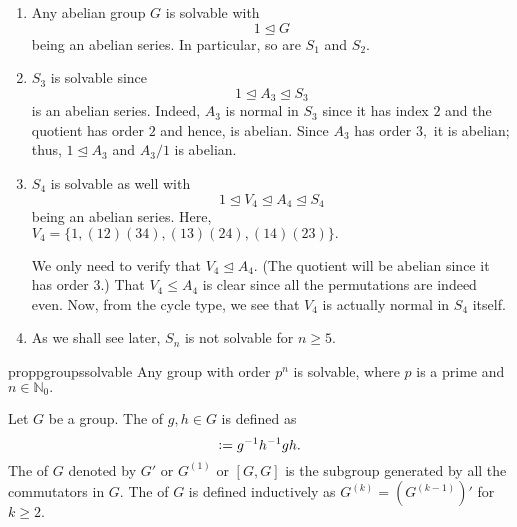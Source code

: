 \begin{ex}
	\phantom{hi}
	\begin{enumerate}
		\item Any abelian group $G$ is solvable with 
		\begin{equation*} 
			1 \unlhd G
		\end{equation*} 
		being an abelian series. In particular, so are $S_1$ and $S_2.$
		\item $S_3$ is solvable since 
		\begin{equation*} 
			1 \unlhd A_3 \unlhd S_3
		\end{equation*}
		is an abelian series. Indeed, $A_3$ is normal in $S_3$ since it has index $2$ and the quotient has order $2$ and hence, is abelian. Since $A_3$ has order $3,$ it is abelian; thus, $1 \unlhd A_3$ and $A_3/1$ is abelian.
		\item $S_4$ is solvable as well with
		\begin{equation*} 
			1 \unlhd V_4 \unlhd A_4 \unlhd S_4
		\end{equation*}
		being an abelian series. Here, $V_4 = \{1, (12)(34), (13)(24), (14)(23)\}.$

		We only need to verify that $V_4 \unlhd A_4.$ (The quotient will be abelian since it has order $3.$) That $V_4 \le A_4$ is clear since all the permutations are indeed even. Now, from the cycle type, we see that $V_4$ is actually normal in $S_4$ itself.
		\item As we shall see later, $S_n$ is not solvable for $n \ge 5.$
	\end{enumerate}
\end{ex}

\begin{restatable}[]{prop}{pgroupssolvable}
\label{prop:pgroupssolvable}
	Any group with order $p^n$ is solvable, where $p$ is a prime and $n \in \mathbb{N}_0.$ \hfill\hyperref[prop:pgroupssolvable2]{\downsym}
\end{restatable}

\begin{defn}%
	Let $G$ be a group. The  of $g, h \in G$ is defined as
	\begin{equation*} 
		[g, h] \vcentcolon= g^{-1}h^{-1}gh.
	\end{equation*}
	The  of $G$ denoted by $G'$ or $G^{(1)}$ or $[G, G]$ is the subgroup generated by all the commutators in $G.$ The  of $G$ is defined inductively as $G^{(k)} = \left(G^{(k - 1)}\right)'$ for $k \ge 2.$
\end{defn}

